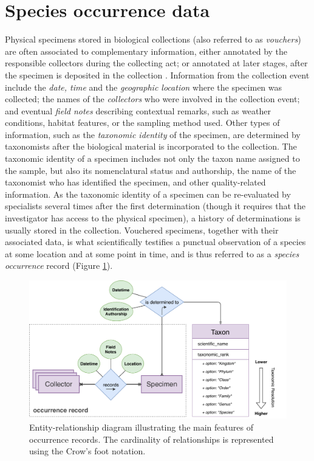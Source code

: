\section{Species occurrence data} \label{section:occurrence_data}
Physical specimens stored in biological collections (also referred to as \textit{vouchers}) are often associated to complementary information, either annotated by the responsible collectors during the collecting act; or annotated at later stages, after the specimen is deposited in the collection \cite{Chapman2005}.
Information from the collection event include the \textit{date, time} and the \textit{geographic location} where the specimen was collected; the names of the \textit{collectors} who were involved in the collection event; and eventual \textit{field notes} describing contextual remarks, such as weather conditions, habitat features, or the sampling method used.
Other types of information, such as the \textit{taxonomic identity} of the specimen, are determined by taxonomists after the biological material is incorporated to the collection.
The taxonomic identity of a specimen includes not only the taxon name assigned to the sample, but also its nomenclatural status and authorship, the name of the taxonomist who has identified the specimen, and other quality-related information.
As the taxonomic identity of a specimen can be re-evaluated by specialists several times after the first determination (though it requires that the investigator has access to the physical specimen), a history of determinations is usually stored in the collection.
Vouchered specimens, together with their associated data, is what scientifically testifies a punctual observation of a species at some location and at some point in time, and is thus referred to as a \textit{species occurrence} record (Figure \ref{fig:occurrences_er}).

\begin{figure}[h!]
  	\centering
    \includegraphics[width=\linewidth]{figures/collections_data/occurrences_er.pdf}
    \caption[Entity-relationship diagram illustrating the main features of occurrence records]{Entity-relationship diagram illustrating the main features of occurrence records. The cardinality of relationships is represented using the Crow's foot notation.}
    \label{fig:occurrences_er}
\end{figure}


